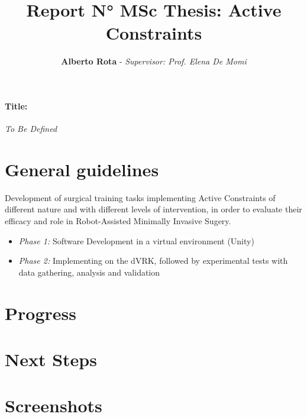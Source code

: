 \documentclass{article}
\title{\textbf{Report N° MSc Thesis: Active Constraints}}
\author{\textbf{Alberto Rota} - \textit{Supervisor: Prof. Elena De Momi}}
\date{}
\begin{document}
\maketitle
\paragraph{Title:} \textit{To Be Defined}
\section*{General guidelines}
    Development of surgical training tasks implementing Active Constraints of
    different nature and with different levels of intervention, in order to
    evaluate their efficacy and role in Robot-Assisted Minimally Invasive Sugery.
    \begin{itemize}
        \item \textit{Phase 1: }Software Development in a virtual environment (Unity)
        \item \textit{Phase 2: }Implementing on the dVRK, followed by
        experimental tests with data gathering, analysis and validation
    \end{itemize}
\section*{Progress}
    
\section*{Next Steps}
    
\newpage
\section*{Screenshots}

    
\end{document}
